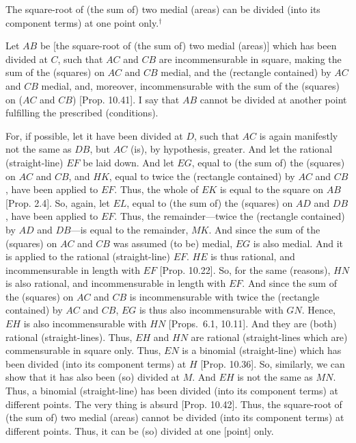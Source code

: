 \begin{Parallel}{}{}
{The square-root of (the sum of) two medial (areas) can be
divided (into its component terms) at one point only.$^\dag$

\epsfysize=2in
\centerline{}

Let $AB$ be [the square-root of (the sum of) two medial (areas)] which has been divided
at $C$, such that $AC$ and $CB$ are incommensurable in square, making the
sum of the (squares) on $AC$ and $CB$ medial, and the (rectangle contained) by $AC$ and $CB$ medial, and, moreover, incommensurable
with the sum of the (squares) on ($AC$ and $CB$) [Prop. 10.41]. I say that $AB$ cannot be divided
at another point fulfilling the prescribed (conditions).

For, if possible, let it have been divided at $D$, such that $AC$ is again
manifestly not the same as $DB$, but $AC$ (is), by hypothesis, greater.
And let the rational (straight-line) $EF$ be laid down. And let $EG$,
equal to (the sum of) the (squares) on $AC$ and $CB$, and $HK$, equal to twice the (rectangle contained) by $AC$ and $CB$,
have been applied to $EF$. Thus, the whole of $EK$ is equal to the
square on $AB$ [Prop. 2.4]. So, again, let $EL$, equal to (the sum of) the (squares)
on $AD$ and $DB$, have been applied to $EF$. Thus, the remainder---twice
the (rectangle contained) by $AD$ and $DB$---is equal to the remainder, $MK$. And since the sum of the (squares) on $AC$ and $CB$
was assumed (to be) medial, $EG$ is also medial. And it is applied
to the rational (straight-line) $EF$. $HE$ is thus rational, and incommensurable in length with $EF$ [Prop. 10.22].  So, for the same (reasons), 
$HN$ is also rational, and incommensurable in length with $EF$.
And since the sum of the (squares) on $AC$ and $CB$ is incommensurable
with twice the (rectangle contained) by $AC$ and $CB$, $EG$ is thus also
incommensurable with $GN$. Hence, $EH$ is also incommensurable with
$HN$ [Props.~6.1, 10.11].
And they are (both) rational (straight-lines). Thus, $EH$ and $HN$ are rational
(straight-lines which are) commensurable in  square only. Thus, $EN$
is a binomial (straight-line) which has been divided (into its component
terms) at $H$ [Prop. 10.36]. So, similarly, we can show that
it has also been (so) divided at $M$. And $EH$ is not the same  as $MN$. Thus,
a binomial (straight-line) has been divided (into its component
terms) at different points. The
very thing is absurd [Prop. 10.42]. Thus,
the square-root of (the sum of) two medial (areas) cannot be divided (into its component terms) at different
points. Thus, it can be (so) divided at one [point] only.}
\end{Parallel}


